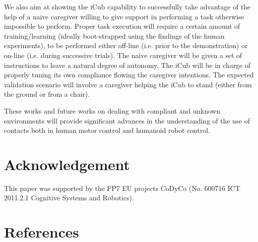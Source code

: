 \documentclass[final,5p,twocolumn]{elsarticle}
\begin{document}
We also aim at showing the iCub capability to successfully take advantage of the help of a naive caregiver willing to give support in performing a task otherwise impossible to perform. Proper task execution will require a certain amount of training/learning (ideally boot-strapped using the findings of the human experiments), to be performed either off-line (i.e. prior to the demonstration) or on-line (i.e. during successive trials). The naive caregiver will be given a set of instructions to leave a natural degree of autonomy. The iCub will be in charge of properly tuning its own compliance flowing the caregiver intentions. The expected validation scenario will involve a caregiver helping the iCub to stand (either from the ground or from a chair).

These works and future works on dealing with compliant and unknown environments will provide significant advances in the understanding of the use of contacts both in human motor control and humanoid robot control.



\section{Acknowledgement}
This paper was supported by the FP7 EU projects CoDyCo (No. 600716 ICT 2011.2.1 Cognitive Systems and Robotics).

\section{References}


\end{document}
